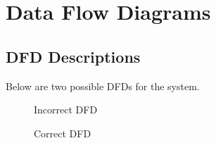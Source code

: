 \documentclass[11pt]{article}
\begin{document}
\section{Data Flow Diagrams}
\subsection{DFD Descriptions}
Below are two possible DFDs for the system.
\begin{figure}[H]
    \centering
    \caption{Incorrect DFD}
\end{figure}
\begin{figure}[H]
    \centering
    \caption{Correct DFD}
\end{figure}
\end{document}

